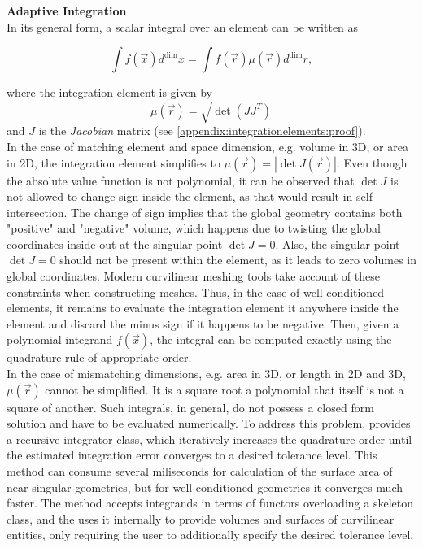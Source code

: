 \noindent
\textbf{Adaptive Integration} \\
%
In its general form, a scalar integral over an element can be written as

\[\int f(\vec{x}) d^{\dim} x = \int f(\vec{r}) \mu(\vec{r}) d^{\dim} r,\]

\noindent
where the integration element is given by \[\mu(\vec{r}) = \sqrt{\det(J J^T)} \] and $J$ is the \textit{Jacobian} matrix (see \cref{appendix:integrationelements:proof}). \\

\noindent
In the case of matching element and space dimension, e.g. volume in 3D, or area in 2D, the integration element simplifies to $\mu(\vec{r}) = |\det J(\vec{r})|$. Even though the absolute value function is not polynomial, it can be observed that $\det J$ is not allowed to change sign inside the element, as that would result in self-intersection. The change of sign implies that the global geometry contains both "positive" and "negative" volume, which happens due to twisting the global coordinates inside out at the singular point $\det J = 0$. Also, the singular point $\det J = 0$ should not be present within the element, as it leads to zero volumes in global coordinates. Modern curvilinear meshing tools take account of these constraints when constructing meshes. Thus, in the case of well-conditioned elements, it remains to evaluate the integration element it anywhere inside the element and discard the minus sign if it happens to be negative. Then, given a polynomial integrand $f(\vec{x})$, the integral can be computed exactly using the quadrature rule of appropriate order. \\

\noindent
In the case of mismatching dimensions, e.g. area in 3D, or length in 2D and 3D, $\mu(\vec{r})$ cannot be simplified. It is a square root a polynomial that itself is not a square of another. Such integrals, in general, do not possess a closed form solution and have to be evaluated numerically. To address this problem, \curvgeom{} provides a recursive integrator class, which iteratively increases the quadrature order until the estimated integration error converges to a desired tolerance level. This method can consume several miliseconds for calculation of the surface area of near-singular geometries, but for well-conditioned geometries it converges much faster. The method accepts integrands in terms of functors overloading a skeleton class, and the \curvgeom{} uses it internally to provide volumes and surfaces of curvilinear entities, only requiring the user to additionally specify the desired tolerance level. \\

